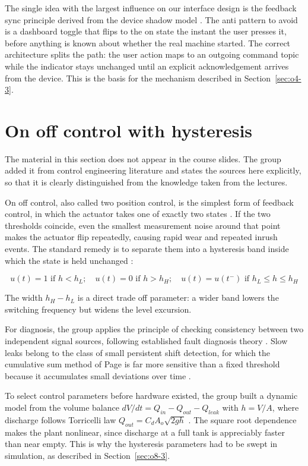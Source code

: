 The single idea with the largest influence on our interface design is the feedback sync principle derived from the device shadow model \cite{slide04}. The anti pattern to avoid is a dashboard toggle that flips to the on state the instant the user presses it, before anything is known about whether the real machine started. The correct architecture splits the path: the user action maps to an outgoing command topic while the indicator stays unchanged until an explicit acknowledgement arrives from the device. This is the basis for the mechanism described in Section~\ref{sec:o4-3}.

\section{On off control with hysteresis}
\label{sec:o2-6}

The material in this section does not appear in the course slides. The group added it from control engineering literature and states the sources here explicitly, so that it is clearly distinguished from the knowledge taken from the lectures.

On off control, also called two position control, is the simplest form of feedback control, in which the actuator takes one of exactly two states \cite{ogata2010}. If the two thresholds coincide, even the smallest measurement noise around that point makes the actuator flip repeatedly, causing rapid wear and repeated inrush events. The standard remedy is to separate them into a hysteresis band inside which the state is held unchanged \cite{astrom2008}:

\begin{equation}
u(t) = 1 \text{ if } h < h_L; \quad u(t) = 0 \text{ if } h > h_H; \quad u(t) = u(t^-) \text{ if } h_L \le h \le h_H
\label{eq:hysteresis}
\end{equation}

The width $h_H - h_L$ is a direct trade off parameter: a wider band lowers the switching frequency but widens the level excursion.

For diagnosis, the group applies the principle of checking consistency between two independent signal sources, following established fault diagnosis theory \cite{isermann2006}. Slow leaks belong to the class of small persistent shift detection, for which the cumulative sum method of Page is far more sensitive than a fixed threshold because it accumulates small deviations over time \cite{page1954}.

To select control parameters before hardware existed, the group built a dynamic model from the volume balance $dV/dt = Q_{in} - Q_{out} - Q_{leak}$ with $h = V/A$, where discharge follows Torricelli law $Q_{out} = C_d A_o \sqrt{2gh}$ \cite{white2011}. The square root dependence makes the plant nonlinear, since discharge at a full tank is appreciably faster than near empty. This is why the hysteresis parameters had to be swept in simulation, as described in Section~\ref{sec:o8-3}.
